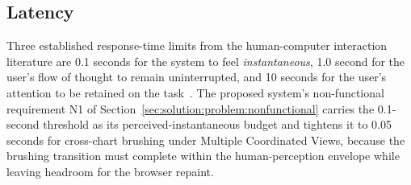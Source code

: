 \subsection{Latency}
\label{sec:foundations:methods:nielsen}

Three established response-time limits from the human-computer
interaction literature are 0.1 seconds for the system to feel
\emph{instantaneous}, 1.0 second for the user's flow of thought to
remain uninterrupted, and 10 seconds for the user's attention to be
retained on the task~\cite{nielsen1993usability}. The proposed
system's non-functional requirement N1 of
Section~\ref{sec:solution:problem:nonfunctional} carries the
0.1-second threshold as its perceived-instantaneous budget and
tightens it to 0.05 seconds for cross-chart brushing under Multiple
Coordinated Views, because the brushing transition must complete
within the human-perception envelope while leaving headroom for the
browser repaint.
